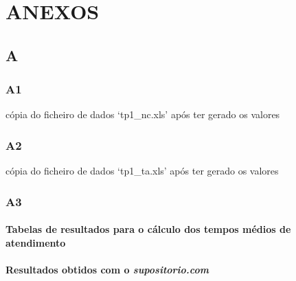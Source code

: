 \appendix

\part*{ANEXOS}

\chapter{A}
\section{A1}
\label{appendix:a}
\begin{longlisting}
	
	\caption{cópia do ficheiro de dados `tp1\_nc.xls' após ter gerado os valores}
	\label{listing:1}
\end{longlisting}
\section{A2}
\begin{longlisting}
	
	\caption{cópia do ficheiro de dados `tp1\_ta.xls' após ter gerado os valores}
	\label{listing:2}
\end{longlisting}
\section{A3}
\subsection{Tabelas de resultados para o cálculo dos tempos médios de atendimento }
\label{appendix:c1}

  
\newpage


\subsection{Resultados obtidos com o \emph{supositorio.com}}
\label{appendix:c2}















